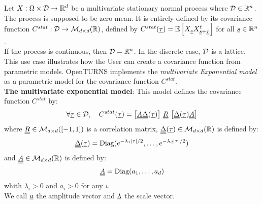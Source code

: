 \renewcommand{\filename}{docUC_StocProc_StationaryCovarianceFunction_Param.tex}
\renewcommand{\filetitle}{UC : Creation of a  parametric stationary covariance function}

\HeaderIIILevel

\label{ParamStationaryCovarianceFunction}


Let $X: \Omega \times {\mathcal D} \rightarrow {\mathbb R}^d$  be a multivariate  stationary normal process where ${\mathcal D} \in {\mathbb R}^n$. The process is supposed to be zero mean. It is entirely defined  by  its covariance function $C^{stat}:  {\mathcal D} \rightarrow  \mathcal{M}_{d \times d}({\mathbb R})$, defined by $C^{stat}({\underline{\tau}})={\mathbb E}\left[ X_{{\underline{s}}}X_{{\underline{s}}+{\underline{\tau}}}^t \right]$ for all ${\underline{s}}\in {\mathbb R}^n$.\\
If the process is continuous, then ${\mathcal D}={\mathbb R}^n$. In the discrete case, ${\mathcal D}$  is a lattice. \\

This use case illustrates how the User can create a covariance function from parametric models. OpenTURNS implements the \emph{multivariate Exponential model} as a parametric model for the covariance function $C^{stat}$. \\

{\bf The multivariate exponential model}: This model defines the  covariance function $C^{stat}$ by:
\begin{equation}
  \label{fullMultivariateExponential2}
  \forall {\underline{\tau}} \in {\mathcal D},\quad C^{stat}( {\underline{\tau}} )=\left[{\underline{\underline{A}}}{\underline{\underline{\Delta}}}( {\underline{\tau}} ) \right] \,{\underline{\underline{R}}}\, \left[ {\underline{\underline{\Delta}}}( {\underline{\tau}} ){\underline{\underline{A}}}\right]
\end{equation}
where ${\underline{\underline{R}}} \in  \mathcal{M}_{d \times d}([-1, 1])$ is a correlation matrix, ${\underline{\underline{\Delta}}}( {\underline{\tau}} ) \in \mathcal{M}_{d \times d}({\mathbb R})$ is defined by:
\begin{equation}
  \label{fullMultivariateExponential3}
  {\underline{\underline{\Delta}}}( {\underline{\tau}} )= \mbox{Diag}(e^{-\lambda_1|\tau|/2}, \dots, e^{-\lambda_d|\tau|/2})
\end{equation}
and ${\underline{\underline{A}}}\in \mathcal{M}_{d \times d}({\mathbb R})$ is defined by:
\begin{equation}
  \label{fullMultivariateExponential4}
  {\underline{\underline{A}}}= \mbox{Diag}(a_1, \dots, a_d)
\end{equation}
whith $\lambda_i>0$ and $a_i>0$ for any $i$.\\
We call ${\underline{a}}$ the amplitude vector and ${\underline{\lambda}}$ the scale vector.\\

